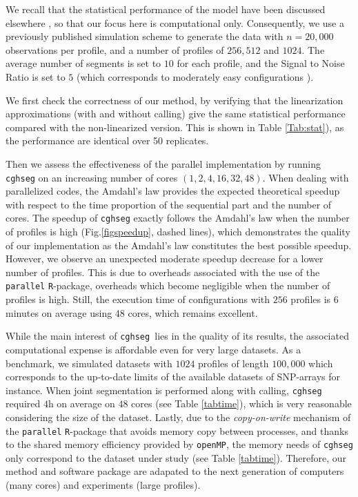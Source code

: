 \documentclass[11pt]{llncs}
\newcommand{\esoft}{\texttt{cghseg }}
\begin{document}
{We recall that the statistical performance of the model have been discussed elsewhere \cite{PLH11}, so that our focus here is computational only. Consequently, we use a previously published simulation scheme to generate the data \cite{PLH11,POA09} with $n=20,000$ observations per profile, and a number of profiles of $256, 512$ and $1024$. The average number of segments is set to $10$ for each profile, and the Signal to Noise Ratio is set to $5$ (which corresponds to  moderately easy configurations \cite{PLH11}). 

We first check the correctness of our method, by verifying that the linearization approximations (with and without calling) give the same statistical performance compared with the non-linearized version. This is shown in Table \ref{Tab:stat}), as the performance are identical over 50 replicates.

Then we assess the effectiveness of the parallel implementation by running \texttt{cghseg} on an increasing number of cores $(1,2,4,16,32,48)$. When dealing with parallelized codes, the Amdahl's law \cite{AG67} provides the expected theoretical speedup with respect to the time proportion of the sequential part and the number of cores. The speedup of \texttt{cghseg} exactly follows the Amdahl's law when the number of profiles is high (Fig.\ref{figspeedup}, dashed lines), which demonstrates the quality of our implementation as the Amdahl's law constitutes the best possible speedup. However, we observe an unexpected moderate speedup decrease for a lower number of profiles. This is due to overheads associated with the use of the \texttt{parallel} \texttt{R}-package, overheads which become negligible when the number of profiles is high. Still, the execution time of configurations with $256$ profiles is $6$ minutes on average using $48$ cores, which remains excellent. 

While the main interest of \esoft lies in the quality of its results, the associated computational expense is affordable even for very large datasets. As a benchmark, we simulated datasets with $1024$ profiles of length $100,000$ which corresponds to the up-to-date limits of the available datasets of SNP-arrays for instance. When joint segmentation is performed along with calling, \texttt{cghseg} required $4$h on average on $48$ cores (see Table \ref{tabtime}), which is very reasonable considering the size of the dataset. Lastly, due to the {\it copy-on-write} mechanism  of the \texttt{parallel} \texttt{R}-package that avoids memory copy between processes, and thanks to the shared memory efficiency provided by \texttt{openMP}, the memory needs of \texttt{cghseg} only correspond to the dataset under study (see Table \ref{tabtime}). Therefore, our method and software package are adapated to the next generation of computers (many cores) and experiments (large profiles).

}
\end{document}
